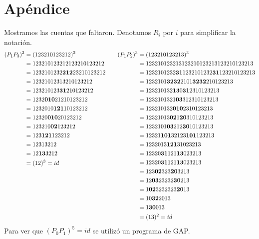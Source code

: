 \documentclass[spanish]{article}
\theoremstyle{definition}
\begin{document}
\clearpage
\section{Apéndice}
Mostramos las cuentas que faltaron. Denotamos $R_i$ por $i$ para simplificar la notación.
\begin{align*}
	\begin{aligned}
		(P_1P_3)^2&=(123210123212)^2\\
		&=123210123212123210123212\\
		&=1232101232\mathbf{212}23210123212\\
		&=12321012313210123212\\
		&=123210123\mathbf{31}210123212\\
		&=1232\mathbf{010}21210123212\\
		&=1232010\mathbf{121}10123212\\
		&=12320\mathbf{010}20123212\\
		&=123210\mathbf{02}123212\\
		&=123\mathbf{121}123212\\
		&=12313212\\
		&=12\mathbf{13}3212\\
		&=(12)^3=id
		\\\leavevmode\\\leavevmode\\\leavevmode\\\leavevmode\\\leavevmode\\\leavevmode\\
	\end{aligned}
	\qquad
	\begin{aligned}
		(P_1P_2)^3&=(123210123213)^3\\
		&=123210123213123210123213123210123213\\
		&=1232101232\mathbf{31}1232101232\mathbf{31}123210123213\\
		&=1232101\mathbf{3232}2101\mathbf{3232}210123213\\
		&=123210132\mathbf{13}0\mathbf{31}2310123213\\
		&=1232101321\mathbf{03}312310123213\\
		&=123210132\mathbf{010}2310123213\\
		&=12321013\mathbf{02}1\mathbf{20}310123213\\
		&=1232101\mathbf{03}212\mathbf{30}10123213\\
		&=12321\mathbf{101}32123\mathbf{101}123213\\
		&=1232013\mathbf{121}31023213\\
		&=12320\mathbf{31}121\mathbf{13}023213\\
		&=12320\mathbf{31}121\mathbf{13}023213\\
		&=123\mathbf{02}323\mathbf{20}3213\\
		&=12\mathbf{03}23232\mathbf{30}213\\
		&=1\mathbf{02}3232323\mathbf{20}13\\
		&=10\mathbf{32}2013\\
		&=1\mathbf{30}013\\
		&=(13)^2=id
	\end{aligned}
\end{align*}
Para ver que $(P_0P_1)^5=id$ se utilizó un programa de GAP.
\end{document}

